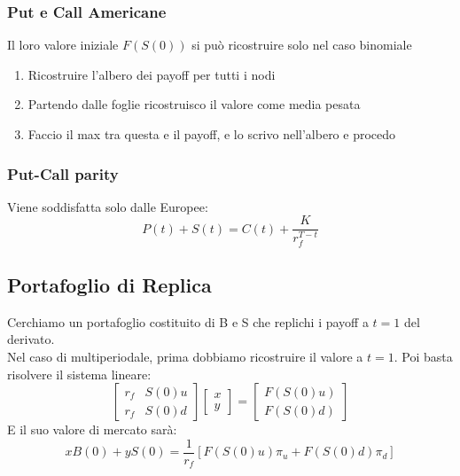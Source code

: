 \documentclass[a4paper,notitlepage]{report}%
\begin{document}
\begin{multicols*}{2}
        \subsubsection*{Put e Call Americane}
            Il loro valore iniziale $F(S(0))$ si può ricostruire
            solo nel caso binomiale
            \begin{enumerate}
                \item Ricostruire l'albero dei payoff per tutti i nodi
                \item Partendo dalle foglie ricostruisco il valore come media pesata
                \item Faccio il max tra questa e il payoff, e lo scrivo nell'albero e procedo
            \end{enumerate}

        \subsubsection*{Put-Call parity}
            Viene soddisfatta solo dalle Europee:
            \[
                P(t) + S(t) = C(t) + \frac{K}{ r_f^{T-t} }    
            \]
    
    
    \subsection*{Portafoglio di Replica}
    Cerchiamo un portafoglio costituito di B e S
    che replichi i payoff a $t=1$ del derivato. \\
    Nel caso di multiperiodale, prima dobbiamo ricostruire il valore
    a $t=1$. Poi basta risolvere il sistema lineare:
    \[
        \begin{bmatrix}
            r_f & S(0)u \\
            r_f & S(0)d  
        \end{bmatrix}
        \begin{bmatrix}
            x \\
            y  
        \end{bmatrix}
        =
        \begin{bmatrix}
            F(S(0)u) \\
            F(S(0)d)  
        \end{bmatrix}
    \]
    E il suo valore di mercato sarà:
    \[
        xB(0)+yS(0) = \frac{1}{r_f} \left[ F(S(0)u) \pi_u + F(S(0)d) \pi_d \right]
    \]
    


\end{multicols*}
\end{document}
